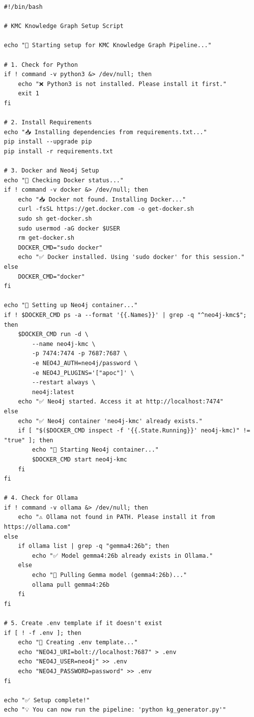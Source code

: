 \documentclass[11pt]{article}
\begin{document}
\begin{lstlisting}[style=bashcode, caption={setup.sh}]
#!/bin/bash

# KMC Knowledge Graph Setup Script

echo "🚀 Starting setup for KMC Knowledge Graph Pipeline..."

# 1. Check for Python
if ! command -v python3 &> /dev/null; then
    echo "❌ Python3 is not installed. Please install it first."
    exit 1
fi

# 2. Install Requirements
echo "📥 Installing dependencies from requirements.txt..."
pip install --upgrade pip
pip install -r requirements.txt

# 3. Docker and Neo4j Setup
echo "🐳 Checking Docker status..."
if ! command -v docker &> /dev/null; then
    echo "📥 Docker not found. Installing Docker..."
    curl -fsSL https://get.docker.com -o get-docker.sh
    sudo sh get-docker.sh
    sudo usermod -aG docker $USER
    rm get-docker.sh
    DOCKER_CMD="sudo docker"
    echo "✅ Docker installed. Using 'sudo docker' for this session."
else
    DOCKER_CMD="docker"
fi

echo "🚢 Setting up Neo4j container..."
if ! $DOCKER_CMD ps -a --format '{{.Names}}' | grep -q "^neo4j-kmc$"; then
    $DOCKER_CMD run -d \
        --name neo4j-kmc \
        -p 7474:7474 -p 7687:7687 \
        -e NEO4J_AUTH=neo4j/password \
        -e NEO4J_PLUGINS='["apoc"]' \
        --restart always \
        neo4j:latest
    echo "✅ Neo4j started. Access it at http://localhost:7474"
else
    echo "✅ Neo4j container 'neo4j-kmc' already exists."
    if [ "$($DOCKER_CMD inspect -f '{{.State.Running}}' neo4j-kmc)" != "true" ]; then
        echo "🔄 Starting Neo4j container..."
        $DOCKER_CMD start neo4j-kmc
    fi
fi

# 4. Check for Ollama
if ! command -v ollama &> /dev/null; then
    echo "⚠️ Ollama not found in PATH. Please install it from https://ollama.com"
else
    if ollama list | grep -q "gemma4:26b"; then
        echo "✅ Model gemma4:26b already exists in Ollama."
    else
        echo "🧠 Pulling Gemma model (gemma4:26b)..."
        ollama pull gemma4:26b
    fi
fi

# 5. Create .env template if it doesn't exist
if [ ! -f .env ]; then
    echo "📝 Creating .env template..."
    echo "NEO4J_URI=bolt://localhost:7687" > .env
    echo "NEO4J_USER=neo4j" >> .env
    echo "NEO4J_PASSWORD=password" >> .env
fi

echo "✅ Setup complete!"
echo "💡 You can now run the pipeline: 'python kg_generator.py'"
\end{lstlisting}
\end{document}
